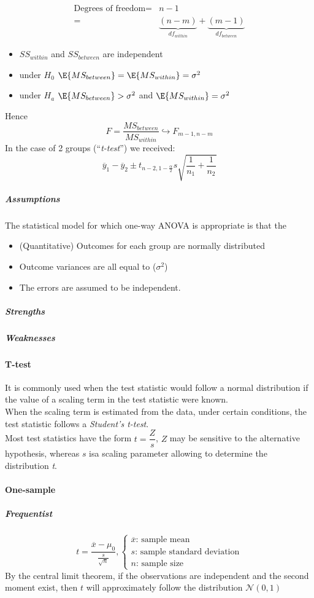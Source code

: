 \begin{align*}
	\text{Degrees of freedom} =& n - 1\\
	=& \underbrace{(n-m)}_{df_{within}} + \underbrace{(m-1)}_{df_{between}}
\end{align*}
\begin{itemize}
	\item $SS_{within}$ and $SS_{between}$ are independent
	\item under $H_{0}$ $\E{MS_{between}} = \E{MS_{within}} = \sigma^{2}$
	\item under $H_{a}$ $\E{MS_{between}}>\sigma^{2}$ and $\E{MS_{within}} = \sigma^{2}$
\end{itemize}
Hence $$ F= \dfrac{MS_{between}}{MS_{within}}\hookrightarrow F_{m-1,n-m}$$
In the case of 2 groups (``\emph{t-test}'') we received:
$$ \overline{y}_{1}-\overline{y}_{2} \pm t_{n-2,1-\frac{\alpha}{2}}s\sqrt{\frac{1}{n_{1}}+
\frac{1}{n_{2}}}$$


\subparagraph{Assumptions}
\begin{center}
	The statistical model for which one-way ANOVA is appropriate is that the
	\begin{itemize}
		\item (Quantitative) Outcomes for each group are normally distributed
		\item Outcome variances are all equal to  ($\sigma^{2}$)
		\item The errors are assumed to be independent.
	\end{itemize}
\end{center}
\subparagraph{Strengths}
\subparagraph{Weaknesses}

\paragraph{T-test}
It is commonly used when the test statistic would follow a normal distribution
if the value of a scaling term in the test statistic were known.\\
When the scaling term is estimated from the data, under certain conditions, the
test statistic follows a \emph{Student's t-test}.\\
Most test statistics have the form $t=\dfrac{Z}{s}$, $Z$ may be sensitive to 
the alternative hypothesis, whereas $s$ isa scaling parameter allowing to determine
the distribution \emph{t}.
\paragraph{One-sample}
\subparagraph{Frequentist}
$$
t = \dfrac{\overline{x} - \mu_{0}}{\frac{s}{\sqrt{n}}},
\begin{cases}
    \overline{x}\text{: sample mean}\\
    s\text{: sample standard deviation}\\
    n\text{: sample size}
\end{cases}
$$
By the central limit theorem, if the observations are independent and the second
moment exist, then $t$ will approximately follow the distribution $\mathcal{N}(0, 1)$

